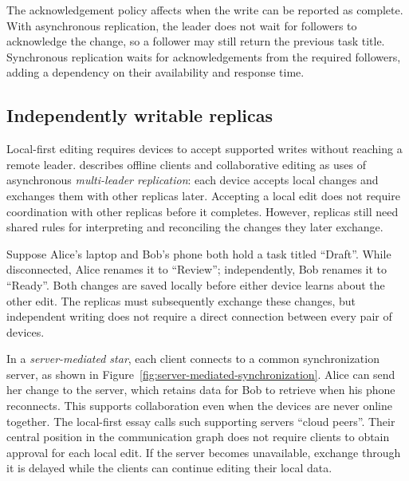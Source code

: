 The acknowledgement policy affects when the write can be reported as complete.
With asynchronous replication, the leader does not wait for followers to acknowledge the change, so a follower may still return the previous task title.
Synchronous replication waits for acknowledgements from the required followers, adding a dependency on their availability and response time.
\parencite[182--183]{understanding-distributed-systems}

\newpage
\subsection{Independently writable replicas}

Local-first editing requires devices to accept supported writes without reaching a remote leader.
\textcite[170--171]{designing-data-intensive-applications} describes offline clients and collaborative editing as uses of asynchronous \emph{multi-leader replication}: each device accepts local changes and exchanges them with other replicas later.
Accepting a local edit does not require coordination with other replicas before it completes.
However, replicas still need shared rules for interpreting and reconciling the changes they later exchange.

Suppose Alice's laptop and Bob's phone both hold a task titled \enquote{Draft}.
While disconnected, Alice renames it to \enquote{Review}; independently, Bob renames it to \enquote{Ready}.
Both changes are saved locally before either device learns about the other edit.
The replicas must subsequently exchange these changes, but independent writing does not require a direct connection between every pair of devices.

In a \emph{server-mediated star}, each client connects to a common synchronization server, as shown in Figure~\ref{fig:server-mediated-synchronization}.
Alice can send her change to the server, which retains data for Bob to retrieve when his phone reconnects.
This supports collaboration even when the devices are never online together.
The local-first essay calls such supporting servers \enquote{cloud peers}.
Their central position in the communication graph does not require clients to obtain approval for each local edit.
If the server becomes unavailable, exchange through it is delayed while the clients can continue editing their local data.
\parencite[173]{local-first-software}

\begin{illustration}[htbp]
	\centering
	\caption{Server-mediated synchronization between independently writable replicas}
	\label{fig:server-mediated-synchronization}
	\begingroup
	
	\endgroup
\end{illustration}
\FloatBarrier

